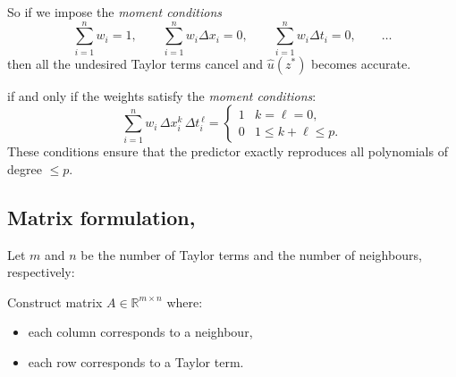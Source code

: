 \documentclass[12pt, a4paper, twoside]{report}
\theoremstyle{plain}
\theoremstyle{definition}
\newcommand{\dxi}{\Delta x_i}
\newcommand{\dti}{\Delta t_i}
\begin{document}
So if we impose the \emph{moment conditions}
\begin{equation}\label{eq:moments-value}
\sum_{i=1}^n w_i = 1,\qquad
\sum_{i=1}^n w_i\Delta x_i = 0,\qquad
\sum_{i=1}^n w_i\Delta t_i = 0,\qquad
\ldots
\end{equation}
then all the undesired Taylor terms cancel and $\hat u(z^*)$ becomes accurate.
\label{sec:taylor}

if and only if the weights satisfy the \emph{moment conditions}:
\begin{equation}
    \sum_{i=1}^n w_i\, \dxi^k\, \dti^{\,\ell} =
    \begin{cases} 1 & k = \ell = 0, \\ 0 & 1 \le k+\ell \le p.
    \end{cases}
    \label{eq:moments}
\end{equation}
These conditions ensure that the predictor exactly reproduces all
polynomials of degree $\le p$.

\subsection{Matrix formulation,}
\label{sec:matrix}

Let $m$ and $n$ be the number of Taylor terms and the number of neighbours, respectively:

Construct matrix $A\in\mathbb{R}^{m\times n}$ where:
\begin{itemize}
\item each column corresponds to a neighbour,
\item each row corresponds to a Taylor term.
\end{itemize}
\end{document}
